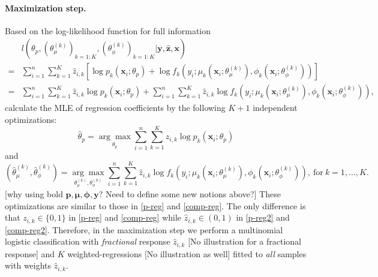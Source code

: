 \documentclass[11pt]{article}
\numberwithin{equation}{section}
\def\bx{\boldsymbol{x}}
\def\by{\boldsymbol{y}}
\def\bp{\boldsymbol{p}}
\def\bmu{\boldsymbol{\mu}}
\def\bphi{\boldsymbol{\phi}}
\def\bz{\boldsymbol{z}}
\begin{document}
\paragraph{Maximization step.}
	Based on the log-likelihood function for full information
	\begin{equation}\label{likelihood}
		\begin{aligned}
			&l\left(\theta_p, (\theta_\mu^{(k)})_{k=1:K}, (\theta_\phi^{(k)})_{k=1:K}|\by,\hat{\bz},\bx\right)\\
			=&\sum_{i=1}^n\sum_{k=1}^K \hat{z}_{i,k}\left[\log p_k(\bx_i;\theta_p) + \log f_k\left(y_i;\mu_k\left(\bx_i;\theta_\mu^{(k)}\right),\phi_k\left(\bx_i;\theta_\phi^{(k)}\right)\right)\right]\\
			=&\sum_{i=1}^n\sum_{k=1}^K \hat{z}_{i,k}\log p_k(\bx_i;\theta_p) + \sum_{i=1}^n\sum_{k=1}^K \hat{z}_{i,k}\log f_k\left(y_i;\mu_k\left(\bx_i;\theta_\mu^{(k)}\right),\phi_k\left(\bx_i;\theta_\phi^{(k)}\right)\right),
		\end{aligned}
	\end{equation}
 calculate the MLE of regression coefficients by the following $K+1$ independent optimizations:
 	\begin{equation}\label{p-reg2}
 	\hat{\theta}_p=\underset{\theta_p}{\arg\max}\sum_{i=1}^n\sum_{k=1}^K\hat{z}_{i,k}\log p_k(\bx_i;\theta_p)
 \end{equation}
 and
 \begin{equation}\label{comp-reg2}
 	\left(\hat{\theta}_\mu^{(k)},\hat{\theta}_\phi^{(k)}\right)=\underset{\theta^{(k)}_\mu,\theta^{(k)}_\phi}{\arg\max}\sum_{i=1}^n\sum_{k=1}^K\hat{z}_{i,k}\log f_k\left(y_i;\mu_k\left(\bx_i;\theta_\mu^{(k)}\right),\phi_k\left(\bx_i;\theta_\phi^{(k)}\right)\right), ~\text{for} ~ k=1,\ldots,K.
 \end{equation}
{\color{blue}[why using bold $\bp,\bmu,\bphi,\by$? Need to define some new notions above?]} These optimizations are similar to those in \eqref{p-reg} and \eqref{comp-reg}. 
The only difference is that ${z}_{i,k}\in\{0,1\}$ in \eqref{p-reg} and \eqref{comp-reg} while $\hat{z}_{i,k}\in(0,1)$ in  \eqref{p-reg2} and \eqref{comp-reg2}.
Therefore, in the maximization step we perform a multinomial logistic classification with {\it fractional} response $\hat{z}_{i,k}$ {\color{blue}[No illustration for a fractional response]} and $K$ {weighted}-regressions {\color{blue}[No illustration as well]} fitted to {\it all} samples with weights $\hat{z}_{i,k}$.
\end{document}
